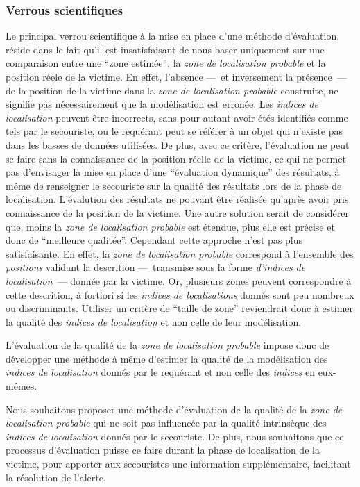 \subsubsection{Verrous scientifiques}

Le principal verrou scientifique à la mise en place d'une méthode
d'évaluation, réside dans le fait qu'il est insatisfaisant de nous
baser uniquement sur une comparaison entre une \enquote{zone estimée},
\ie la \emph{zone de localisation probable} et la position réele de la
victime. En effet, l'absence ---~et inversement la présence~--- de la
position de la victime dans la \emph{zone de localisation probable}
construite, ne signifie pas nécessairement que la modélisation est
erronée. Les \emph{indices de localisation} peuvent être incorrects,
sans pour autant avoir étés identifiés comme tels par le secouriste,
ou le requérant peut se référer à un objet qui n'existe pas dans les
basses de données utilisées. De plus, avec ce critère, l'évaluation ne
peut se faire sans la connaissance de la position réelle de la
victime, ce qui ne permet pas d'envisager la mise en place d'une
\enquote{évaluation dynamique} des résultats, à même de renseigner le
secouriste sur la qualité des résultats lors de la phase de
localisation. L'évalution des résultats ne pouvant être réalisée
qu'après avoir pris connaissance de la position de la victime. Une
autre solution serait de considérer que, moins la \emph{zone de
  localisation probable} est étendue, plus elle est précise et donc de
\enquote{meilleure qualitée}. Cependant cette approche n'est pas plus
satisfaisante.  En effet, la \emph{zone de localisation probable}
correspond à l'ensemble des \emph{positions} validant la descrition
---~transmise sous la forme \emph{d'indices de localisation}~---
donnée par la victime. Or, plusieurs zones peuvent correspondre à
cette descrition, à fortiori si les \emph{indices de localisations}
donnés sont peu nombreux ou discriminants. Utiliser un critère de
\enquote{taille de zone} reviendrait donc à estimer la qualité des
\emph{indices de localisation} et non celle de leur modélisation.

L’évaluation de la qualité de la \emph{zone de localisation probable}
impose donc de développer une méthode à même d'estimer la qualité de
la modélisation des \emph{indices de localisation} donnés par le
requérant et non celle des \emph{indices} en eux-mêmes. 

Nous souhaitons proposer une méthode d'évaluation de la qualité de la
\emph{zone de localisation probable} qui ne soit pas influencée par la
qualité intrinsèque des \emph{indices de localisation} donnés par le
secouriste. De plus, nous souhaitons que ce processus d'évaluation
puisse ce faire durant la phase de localisation de la victime, pour
apporter aux secouristes une information supplémentaire, facilitant la
résolution de l'alerte.

